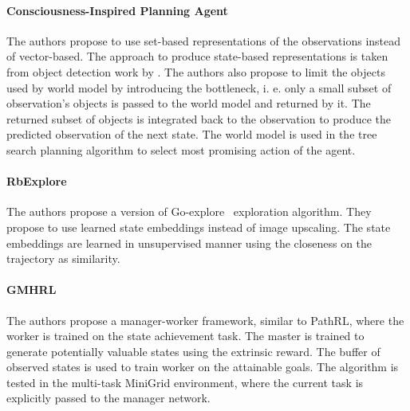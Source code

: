 \documentclass[acmsmall, nonacm]{acmart}
\begin{document}

\paragraph{Consciousness-Inspired Planning Agent \citet{Zhao2021ACP}}

The authors propose to use set-based representations of the observations instead of vector-based. The approach to produce state-based representations is taken from object detection work by \citet{Carion2020EndtoEndOD}. The authors also propose to limit the objects used by world model by introducing the bottleneck, i. e. only a small subset of observation's objects is passed to the world model and returned by it. The returned subset of objects is integrated back to the observation to produce the predicted observation of the next state. The world model is used in the tree search planning algorithm to select most promising action of the agent.


\paragraph{RbExplore \citet{Ugadiarov2021LongTermEI}}

The authors propose a version of Go-explore~\citet{ecoffet_first_2021} exploration algorithm. They propose to use learned state embeddings instead of image upscaling. The state embeddings are learned in unsupervised manner using the closeness on the trajectory as similarity.


\paragraph{GMHRL \citet{chen2019learning}}

The authors propose a manager-worker framework, similar to PathRL, where the worker is trained on the state achievement task. The master is trained to generate potentially valuable states using the extrinsic reward. The buffer of observed states is used to train worker on the attainable goals. The algorithm is tested in the multi-task MiniGrid environment, where the current task is explicitly passed to the manager network.


\medskip



\end{document}
